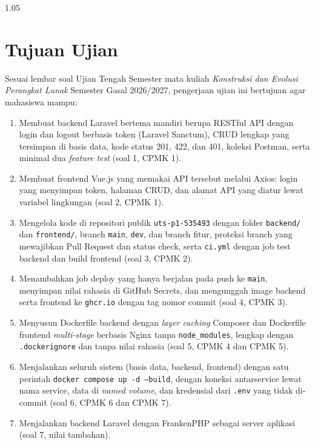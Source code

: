 \documentclass[a4paper,oneside,12pt]{report}
\begin{document}
\begin{spacing}{1.05}
\tableofcontents
\end{spacing}
\clearpage

\chapter[Tujuan Ujian]{Tujuan Ujian}
Sesuai lembar soal Ujian Tengah Semester mata kuliah \textit{Konstruksi dan Evolusi Perangkat Lunak} Semester Gasal 2026/2027, pengerjaan ujian ini bertujuan agar mahasiswa mampu:
\begin{enumerate}
    \item Membuat backend Laravel bertema mandiri berupa RESTful API dengan login dan logout berbasis token (Laravel Sanctum), CRUD lengkap yang tersimpan di basis data, kode status 201, 422, dan 401, koleksi Postman, serta minimal dua \textit{feature test} (soal 1, CPMK 1).
    \item Membuat frontend Vue.js yang memakai API tersebut melalui Axios: login yang menyimpan token, halaman CRUD, dan alamat API yang diatur lewat variabel lingkungan (soal 2, CPMK 1).
    \item Mengelola kode di repositori publik \texttt{uts-p1-535493} dengan folder \texttt{backend/} dan \texttt{frontend/}, branch \texttt{main}, \texttt{dev}, dan branch fitur, proteksi branch yang mewajibkan Pull Request dan status check, serta \texttt{ci.yml} dengan job test backend dan build frontend (soal 3, CPMK 2).
    \item Menambahkan job deploy yang hanya berjalan pada push ke \texttt{main}, menyimpan nilai rahasia di GitHub Secrets, dan mengunggah image backend serta frontend ke \texttt{ghcr.io} dengan tag nomor commit (soal 4, CPMK 3).
    \item Menyusun Dockerfile backend dengan \textit{layer caching} Composer dan Dockerfile frontend \textit{multi-stage} berbasis Nginx tanpa \texttt{node\_modules}, lengkap dengan \texttt{.dockerignore} dan tanpa nilai rahasia (soal 5, CPMK 4 dan CPMK 5).
    \item Menjalankan seluruh sistem (basis data, backend, frontend) dengan satu perintah \texttt{docker compose up -d --build}, dengan koneksi antarservice lewat nama service, data di \textit{named volume}, dan kredensial dari \texttt{.env} yang tidak di-commit (soal 6, CPMK 6 dan CPMK 7).
    \item Menjalankan backend Laravel dengan FrankenPHP sebagai server aplikasi (soal 7, nilai tambahan).
\end{enumerate}
\end{document}
